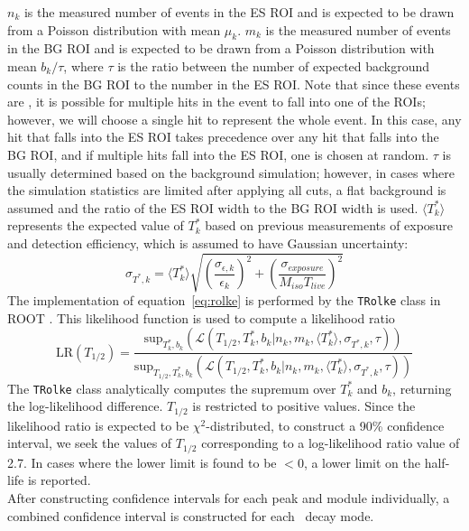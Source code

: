 \documentclass[/main.tex]{subfiles}
\begin{document}
$n_k$ is the measured number of events in the ES ROI and is expected to be drawn from a Poisson distribution with mean $\mu_k$.
$m_k$ is the measured number of events in the BG ROI and is expected to be drawn from a Poisson distribution with mean $b_k/\tau$, where $\tau$ is the ratio between the number of expected background counts in the BG ROI to the number in the ES ROI.
Note that since these events are \msmd, it is possible for multiple hits in the event to fall into one of the ROIs; however, we will choose a single hit to represent the whole event.
In this case, any hit that falls into the ES ROI takes precedence over any hit that falls into the BG ROI, and if multiple hits fall into the ES ROI, one is chosen at random.
$\tau$ is usually determined based on the background simulation; however, in cases where the simulation statistics are limited after applying all cuts, a flat background is assumed and the ratio of the ES ROI width to the BG ROI width is used.
$\langle T^*_k\rangle$ represents the expected value of $T^*_k$ based on previous measurements of exposure and detection efficiency, which is assumed to have Gaussian uncertainty:
\begin{equation}
  \sigma_{T^*,k} = \langle T^*_k\rangle\sqrt{(\frac{\sigma_{\epsilon,k}}{\epsilon_k })^2 + (\frac{\sigma_{exposure}}{M_{iso}T_{live} })^2}
\end{equation}
The implementation of equation~\ref{eq:rolke} is performed by the \texttt{TRolke} class in ROOT \cite{2005rolke}.
This likelihood function is used to compute a likelihood ratio
\begin{equation}
  \mathrm{LR}(T_{1/2}) = \frac{\mathrm{sup}_{T^*_k,b_k}(\mathcal{L}(T_{1/2},T^*_k,b_k|n_k,m_k,\langle T^*_k\rangle, \sigma_{T^*,k},\tau))}{\mathrm{sup}_{T_{1/2},T^*_k,b_k}(\mathcal{L}(T_{1/2},T^*_k,b_k|n_k,m_k,\langle T^*_k\rangle, \sigma_{T^*,k},\tau))}
\end{equation}
The \texttt{TRolke} class analytically computes the supremum over $T^*_k$ and $b_k$, returning the log-likelihood difference.
$T_{1/2}$ is restricted to positive values.
Since the likelihood ratio is expected to be $\chi^2$-distributed, to construct a 90\% confidence interval, we seek the values of $T_{1/2}$ corresponding to a log-likelihood ratio value of 2.7.
In cases where the lower limit is found to be $<0$, a lower limit on the half-life is reported.
\\
After constructing confidence intervals for each peak and module individually, a combined confidence interval is constructed for each \bbes\ decay mode.
\end{document}
